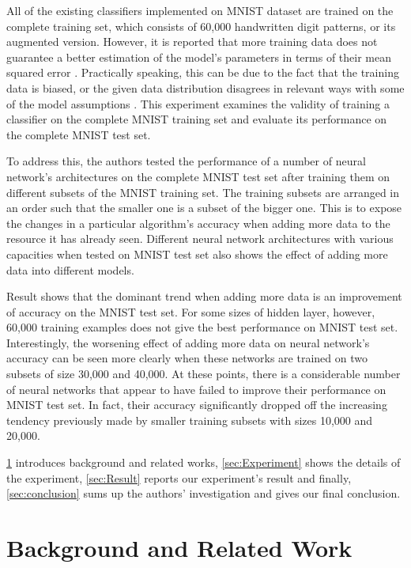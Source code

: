 \documentclass[conference]{IEEEtran}
\begin{document}
All of the existing classifiers implemented on MNIST dataset are trained on the complete training set, which consists of 60,000 handwritten digit patterns, or its augmented version\cite{Lecun98gradient-basedlearning}. However, it is reported that more training data does not guarantee a better estimation of the model's parameters in terms of their mean squared error \cite{IGotMoreData,WhenItSeem}. Practically speaking, this can be due to the fact that the training data is biased, or the given data distribution disagrees in relevant ways with some of the model assumptions \cite{WhenItSeem}. This experiment examines the validity of training a classifier on the complete MNIST training set and evaluate its performance on the complete MNIST test set.

To address this, the authors tested the performance of a number of neural network's architectures on the complete MNIST test set after training them on different subsets of the MNIST training set. The training subsets are arranged in an order such that the smaller one is a subset of the bigger one. This is to expose the changes in a particular algorithm's accuracy when adding more data to the resource it has already seen. Different neural network architectures with various capacities when tested on MNIST test set also shows the effect of adding more data into different models.

Result shows that the dominant trend when adding more data is an improvement of accuracy on the MNIST test set. For some sizes of hidden layer, however, 60,000 training examples does not give the best performance on MNIST test set. Interestingly, the worsening effect of adding more data on neural network's accuracy can be seen more clearly when these networks are trained on two subsets of size 30,000 and 40,000. At these points, there is a considerable number of neural networks that appear to have failed to improve their performance on MNIST test set. In fact, their accuracy significantly dropped off the increasing tendency previously made by smaller training subsets with sizes 10,000 and 20,000.

\cref{sec:background} introduces background and related works, \cref{sec:Experiment} shows the details of the experiment, \cref{sec:Result} reports our experiment's result and finally, \cref{sec:conclusion} sums up the authors' investigation and gives our final conclusion.
\section{Background and Related Work}
\label{sec:background}
\end{document}

